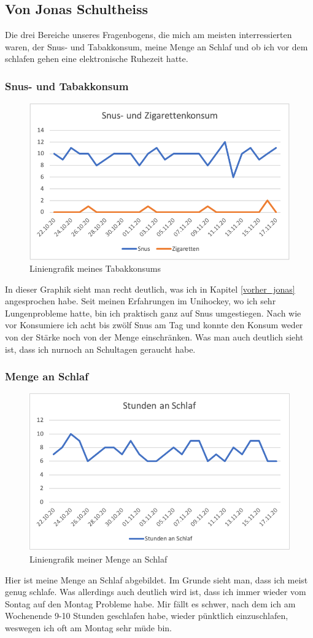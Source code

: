 \subsection{Von Jonas Schultheiss}
\authortoc{\jonas}{\subsectionident}
Die drei Bereiche unseres Fragenbogens, die mich am meisten interressierten waren, der Snus- und Tabakkonsum, meine Menge an Schlaf und ob ich vor dem schlafen gehen eine elektronische Ruhezeit hatte.
\subsubsection{Snus- und Tabakkonsum}
\begin{figure}[!ht]
  \centering
  \includegraphics[width=0.6\linewidth]{./images/tabak_jonas.png}
  \caption{Liniengrafik meines Tabakkonsums}
  \label{fig:tabak_jonas}
\end{figure}
In dieser Graphik sieht man recht deutlich, was ich in Kapitel \ref{vorher_jonas} angesprochen habe. Seit meinen Erfahrungen im Unihockey, wo ich sehr Lungenprobleme hatte, bin ich praktisch ganz auf Snus umgestiegen. Nach wie vor Konsumiere ich acht bis zwölf Snus am Tag und konnte den Konsum weder von der Stärke noch von der Menge einschränken. Was man auch deutlich sieht ist, dass ich nurnoch an Schultagen geraucht habe. 
\subsubsection{Menge an Schlaf}
\begin{figure}[!ht]
  \centering
  \includegraphics[width=0.6\linewidth]{./images/schlaf_jonas.png}
  \caption{Liniengrafik meiner Menge an Schlaf}
  \label{fig:schlaf_jonas}
\end{figure}
Hier ist meine Menge an Schlaf abgebildet. Im Grunde sieht man, dass ich meist genug schlafe. Was allerdings auch deutlich wird ist, dass ich immer wieder vom Sontag auf den Montag Probleme habe. Mir fällt es schwer, nach dem ich am Wochenende 9-10 Stunden geschlafen habe, wieder pünktlich einzuschlafen, weswegen ich oft am Montag sehr müde bin.
